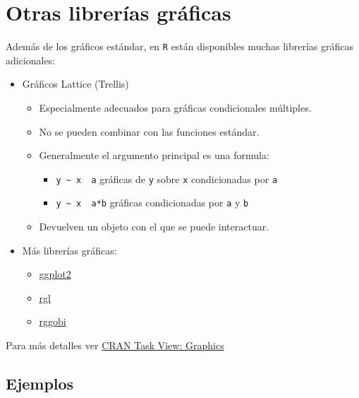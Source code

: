 \documentclass[
]{book}
\theoremstyle{break}
\theoremstyle{nonumberplain}
\begin{document}
\hypertarget{otras-libreruxedas-gruxe1ficas}{%
\section{Otras librerías gráficas}\label{otras-libreruxedas-gruxe1ficas}}

Además de los gráficos estándar, en \texttt{R} están disponibles muchas librerías gráficas adicionales:

\begin{itemize}
\item
  Gráficos Lattice (Trellis)

  \begin{itemize}
  \item
    Especialmente adecuados para gráficas condicionales múltiples.
  \item
    No se pueden combinar con las funciones estándar.
  \item
    Generalmente el argumento principal es una formula:

    \begin{itemize}
    \item
      \texttt{y\ \textasciitilde{}\ x\ \textbar{}\ a} gráficas de \texttt{y} sobre \texttt{x} condicionadas por \texttt{a}
    \item
      \texttt{y\ \textasciitilde{}\ x\ \textbar{}\ a*b} gráficas condicionadas por \texttt{a} y \texttt{b}
    \end{itemize}
  \item
    Devuelven un objeto con el que se puede interactuar.
  \end{itemize}
\item
  Más librerías gráficas:

  \begin{itemize}
  \item
    \href{http://had.co.nz/ggplot2}{ggplot2}
  \item
    \href{http://rgl.neoscientists.org}{rgl}
  \item
    \href{http://www.ggobi.org/rggobi}{rggobi}
  \end{itemize}
\end{itemize}

Para más detalles ver \href{http://cran.r-project.org/web/views/Graphics.html}{CRAN Task View: Graphics}

\hypertarget{ejemplos-2}{%
\subsection{Ejemplos}\label{ejemplos-2}}
\end{document}
